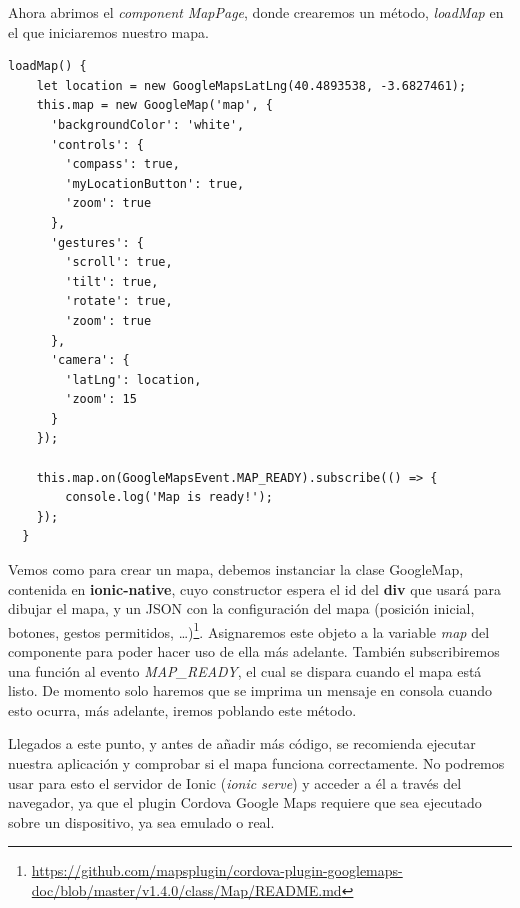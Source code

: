 Ahora abrimos el \emph{component} \emph{MapPage}, donde crearemos un método, \emph{loadMap} en el que iniciaremos nuestro mapa.

\begin{lstlisting}[style=htmlcssjs,frame=tlrb,xleftmargin={0.2cm}]
  loadMap() {
    let location = new GoogleMapsLatLng(40.4893538, -3.6827461);
    this.map = new GoogleMap('map', {
      'backgroundColor': 'white',
      'controls': {
        'compass': true,
        'myLocationButton': true,
        'zoom': true
      },
      'gestures': {
        'scroll': true,
        'tilt': true,
        'rotate': true,
        'zoom': true
      },
      'camera': {
        'latLng': location,
        'zoom': 15
      }
    });

    this.map.on(GoogleMapsEvent.MAP_READY).subscribe(() => {
        console.log('Map is ready!');
    });
  }
\end{lstlisting}

Vemos como para crear un mapa, debemos instanciar la clase GoogleMap, contenida en \textbf{ionic-native}, cuyo constructor espera el id del \textbf{div} que usará para dibujar el mapa, y un \gls{JSON} con la configuración del mapa (posición inicial, botones, gestos permitidos, \ldots)\footnote{\url{https://github.com/mapsplugin/cordova-plugin-googlemaps-doc/blob/master/v1.4.0/class/Map/README.md}}. Asignaremos este objeto a la variable \emph{map} del componente para poder hacer uso de ella más adelante. También subscribiremos una función al evento \emph{MAP\_READY}, el cual se dispara cuando el mapa está listo. De momento solo haremos que se imprima un mensaje en consola cuando esto ocurra, más adelante, iremos poblando este método.

Llegados a este punto, y antes de añadir más código, se recomienda ejecutar nuestra aplicación y comprobar si el mapa funciona correctamente. No podremos usar para esto el servidor de Ionic (\emph{ionic serve}) y acceder a él a través del navegador, ya que el plugin Cordova Google Maps requiere que sea ejecutado sobre un dispositivo, ya sea emulado o real.


